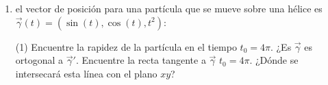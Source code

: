 \documentclass[letterpaper,11pt]{article}
\begin{document}
\begin{enumerate}
\begin{tasks}(1)
\task $\vec{\gamma}(t) = (\sin(t), 4\cos(t))$, donde $0 \leq t \leq 2\pi$.
\task $\vec{\gamma}(t) = (2\sin(t), 4\cos(t))$, donde $0 \leq t \leq 2\pi$
\task $\vec{\gamma}(t) = (t\sin(t), t\cos(t), t)$, donde $ -4\pi \leq t \leq 4\pi$
\end{tasks}

\item el vector de posición para una partícula que se mueve sobre una hélice es $\vec{\gamma}(t) = (\sin(t), \cos(t), t^2)$:

\begin{tasks}(1)
\task Encuentre la rapidez de la partícula en el tiempo  $t_0 = 4\pi$.
\task ¿Es $\vec{\gamma}$ es ortogonal a  $\vec{\gamma}'$.
\task Encuentre la recta tangente a $\vec{\gamma}$ $t_0 = 4\pi$.
\task ¿Dónde se intersecará esta línea con el plano $xy$?
\end{tasks}
\end{enumerate}
\end{document}
